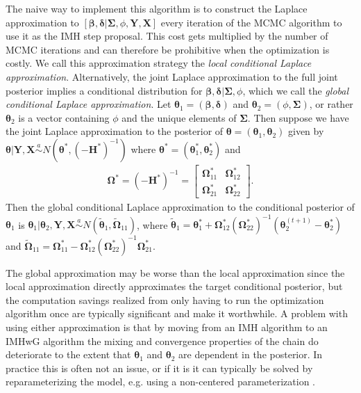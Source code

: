 \documentclass[12pt]{article}
\begin{document}
The naive way to implement this algorithm is to construct the Laplace approximation to $[\bm{\beta},\bm{\delta}|\bm{\Sigma},\phi,\bm{Y},\bm{X}]$ every iteration of the MCMC algorithm to use it as the IMH step proposal. This cost gets multiplied by the number of MCMC iterations and can therefore be prohibitive when the optimization is costly. We call this approximation strategy the {\it local conditional Laplace approximation}. Alternatively, the joint Laplace approximation to the full joint posterior implies a conditional distribution for $\bm{\beta}, \bm{\delta}|\bm{\Sigma},\phi$, which we call the {\it global conditional Laplace approximation}. Let $\bm{\theta}_1 = (\bm{\beta}, \bm{\delta})$ and $\bm{\theta}_2 = (\phi, \bm{\Sigma})$, or rather $\bm{\theta}_2$ is a vector containing $\phi$ and the unique elements of $\bm{\Sigma}$. Then suppose we have the joint Laplace approximation to the posterior of $\bm{\theta} = (\bm{\theta}_1, \bm{\theta}_2)$ given by $\bm{\theta}|\bm{Y},\bm{X} \stackrel{a}{\sim} N(\bm{\theta}^*, (-\bm{H}^*)^{-1})$ where $\bm{\theta}^* = (\bm{\theta}^*_1, \bm{\theta}_2^*)$ and 
\begin{align*}
\bm{\Omega}^* = (-\bm{H}^*)^{-1} = \begin{bmatrix} \bm{\Omega}^*_{11} & \bm{\Omega}^*_{12} \\ \bm{\Omega}^*_{21} & \bm{\Omega}^*_{22} \end{bmatrix}.
\end{align*}
Then the global conditional Laplace approximation to the conditional posterior of $\bm{\theta}_1$ is $\bm{\theta}_1|\bm{\theta}_2,\bm{Y},\bm{X} \stackrel{a}{\sim} N(\widetilde{\bm{\theta}}_1, \widetilde{\bm{\Omega}}_{11})$, where $\widetilde{\bm{\theta}}_1 = \bm{\theta}_1^* + \bm{\Omega}_{12}^*(\bm{\Omega}_{22}^*)^{-1}(\bm{\theta}_2^{(t+1)} - \bm{\theta}_2^*)$ and $\widetilde{\bm{\Omega}}_{11} = \bm{\Omega}_{11}^* - \bm{\Omega}_{12}^*(\bm{\Omega}_{22}^*)^{-1}\bm{\Omega}_{21}^*$.

The global approximation may be worse than the local approximation since the local approximation directly approximates the target conditional posterior, but the computation savings realized from only having to run the optimization algorithm once are typically significant and make it worthwhile. A problem with using either approximation is that by moving from an IMH algorithm to an IMHwG algorithm the mixing and convergence properties of the chain do deteriorate to the extent that $\bm{\theta}_1$ and $\bm{\theta}_2$ are dependent in the posterior. In practice this is often not an issue, or if it is it can typically be solved by reparameterizing the model, e.g. using a non-centered parameterization \citep{gelfand1995efficient,roberts1997updating,van2001art,bernardo2003non}.
\end{document}
